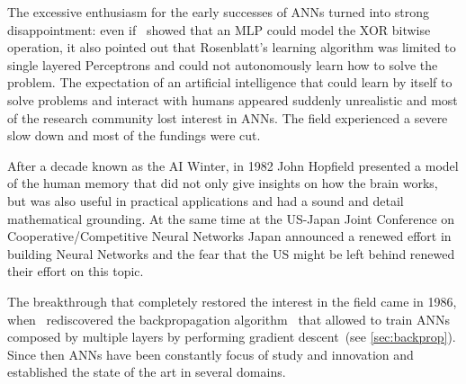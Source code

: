 The excessive enthusiasm for the early successes of ANNs turned into strong
disappointment: even if~\cite{Minsky69} showed that an MLP could model the XOR
bitwise operation, it also pointed out that Rosenblatt's learning algorithm was
limited to single layered Perceptrons and could not autonomously learn how to
solve the problem. The expectation of an artificial intelligence that could
learn by itself to solve problems and interact with humans appeared suddenly
unrealistic and most of the research community lost interest in ANNs. The field
experienced a severe slow down and most of the fundings were cut.

After a decade known as the AI Winter, in 1982 John Hopfield presented a model
of the human memory that did not only give insights on how the brain works, but
was also useful in practical applications and had a sound and detail
mathematical grounding. At the same time at the US-Japan Joint Conference on
Cooperative/Competitive Neural Networks Japan announced a renewed effort in
building Neural Networks and the fear that the US might be left behind renewed
their effort on this topic.

The breakthrough that completely restored the interest in the field came in
1986, when~\cite{Rumelhart86b} rediscovered the backpropagation
algorithm~\citep{Linnainmaa70,Werbos74} that allowed to train ANNs composed by
multiple layers by performing gradient descent~(see \autoref{sec:backprop}).
Since then ANNs have been constantly focus of study and innovation and
established the state of the art in several domains.


